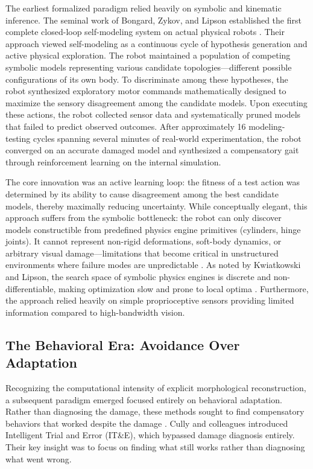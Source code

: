 \documentclass[12pt,a4paper,oneside]{report}
\begin{document}
The earliest formalized paradigm relied heavily on symbolic and kinematic inference. The seminal work of Bongard, Zykov, and Lipson established the first complete closed-loop self-modeling system on actual physical robots \cite{bongard2006resilient}. Their approach viewed self-modeling as a continuous cycle of hypothesis generation and active physical exploration. The robot maintained a population of competing symbolic models representing various candidate topologies—different possible configurations of its own body. To discriminate among these hypotheses, the robot synthesized exploratory motor commands mathematically designed to maximize the sensory disagreement among the candidate models. Upon executing these actions, the robot collected sensor data and systematically pruned models that failed to predict observed outcomes. After approximately 16 modeling-testing cycles spanning several minutes of real-world experimentation, the robot converged on an accurate damaged model and synthesized a compensatory gait through reinforcement learning on the internal simulation.

The core innovation was an active learning loop: the fitness of a test action was determined by its ability to cause disagreement among the best candidate models, thereby maximally reducing uncertainty. While conceptually elegant, this approach suffers from the symbolic bottleneck: the robot can only discover models constructible from predefined physics engine primitives (cylinders, hinge joints). It cannot represent non-rigid deformations, soft-body dynamics, or arbitrary visual damage—limitations that become critical in unstructured environments where failure modes are unpredictable \cite{kwiatkowski2019task}. As noted by Kwiatkowski and Lipson, the search space of symbolic physics engines is discrete and non-differentiable, making optimization slow and prone to local optima \cite{kwiatkowski2019task}. Furthermore, the approach relied heavily on simple proprioceptive sensors providing limited information compared to high-bandwidth vision.

\subsection{The Behavioral Era: Avoidance Over Adaptation}
\label{subsec:behavioral_era}

Recognizing the computational intensity of explicit morphological reconstruction, a subsequent paradigm emerged focused entirely on behavioral adaptation. Rather than diagnosing the damage, these methods sought to find compensatory behaviors that worked despite the damage \cite{cully2015robots}. Cully and colleagues introduced Intelligent Trial and Error (IT\&E), which bypassed damage diagnosis entirely. Their key insight was to focus on finding what still works rather than diagnosing what went wrong.
\end{document}
